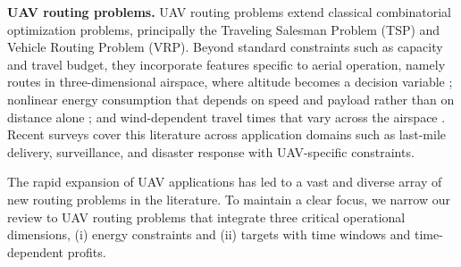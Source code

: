 \documentclass[11pt]{article}
\begin{document}
\textbf{UAV routing problems. }UAV routing problems extend classical combinatorial optimization problems, principally the Traveling Salesman Problem (TSP) and Vehicle Routing Problem (VRP). Beyond standard constraints such as capacity and travel budget, they incorporate features specific to aerial operation, namely routes in three-dimensional airspace, where altitude becomes a decision variable \citep{zhen2019vehicle}; nonlinear energy consumption that depends on speed and payload rather than on distance alone \citep{cheng2020drone, dorling2016vehicle, zeng2019energy}; and wind-dependent travel times that vary across the airspace \citep{yang2025bi}. Recent surveys \citep{khoufi2019survey, macrina2020drone, rojas2021unmanned} cover this literature across application domains such as last-mile delivery, surveillance, and disaster response with UAV-specific constraints.

The rapid expansion of UAV applications has led to a vast and diverse array of new routing problems in the literature. To maintain a clear focus, we narrow our review to UAV routing problems that integrate three critical operational dimensions, (i) energy constraints and (ii) targets with time windows and time-dependent profits.
\end{document}
